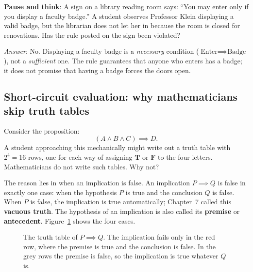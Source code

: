 \begin{recoverybox}
\textbf{Pause and think}: A sign on a library reading room says: ``You may enter only if you display a faculty badge.'' A student observes Professor Klein displaying a valid badge, but the librarian does not let her in because the room is closed for renovations. Has the rule posted on the sign been violated?

\emph{Answer}: No. Displaying a faculty badge is a \emph{necessary} condition ($\text{Enter} \implies \text{Badge}$), not a \emph{sufficient} one. The rule guarantees that anyone who enters has a badge; it does not promise that having a badge forces the doors open.
\end{recoverybox}

\subsection{Short-circuit evaluation: why mathematicians skip truth tables}

Consider the proposition:
\[
(A \land B \land C) \implies D.
\]
A student approaching this mechanically might write out a truth table with $2^4 = 16$ rows, one for each way of assigning $\mathbf{T}$ or $\mathbf{F}$ to the four letters. Mathematicians do not write such tables. Why not?

The reason lies in when an implication is false. An implication $P \implies Q$ is false in exactly one case: when the hypothesis $P$ is true and the conclusion $Q$ is false. When $P$ is false, the implication is true automatically; Chapter~7 called this \textbf{vacuous truth}. The hypothesis of an implication is also called its \textbf{premise} or \textbf{antecedent}. Figure~\ref{27:fig-implication-table} shows the four cases.

\begin{figure}[htbp]
\centering
{}
\caption{The truth table of $P \implies Q$. The implication fails only in the red row, where the premise is true and the conclusion is false. In the grey rows the premise is false, so the implication is true whatever $Q$ is.}
\label{27:fig-implication-table}
\end{figure}

